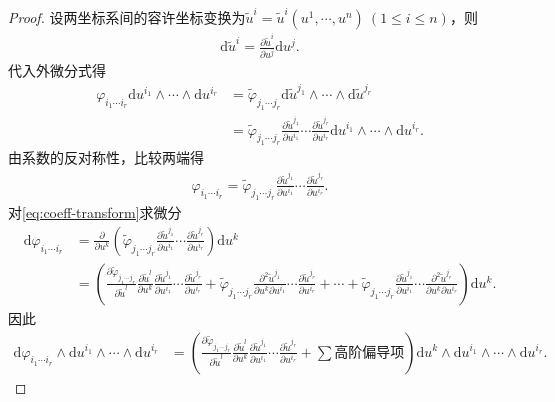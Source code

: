 \documentclass[../../main.tex]{subfiles}%
\begin{document}
\begin{proof}
设两坐标系间的容许坐标变换为$\tilde{u}^i=\tilde{u}^i(u^1,\cdots,u^n)\ (1\leqslant i\leqslant n)$，则
\begin{align}
\mathrm{d}\tilde{u}^i = \frac{\partial\tilde{u}^i}{\partial u^j}\mathrm{d}u^j. \label{eq:coord-diff}
\end{align}
代入外微分式得
\begin{align*}
\varphi_{i_1\cdots i_r}\mathrm{d}u^{i_1}\land\cdots\land\mathrm{d}u^{i_r} &= \tilde{\varphi}_{j_1\cdots j_r}\mathrm{d}\tilde{u}^{j_1}\land\cdots\land\mathrm{d}\tilde{u}^{j_r} \\
&= \tilde{\varphi}_{j_1\cdots j_r}\frac{\partial\tilde{u}^{j_1}}{\partial u^{i_1}}\cdots\frac{\partial\tilde{u}^{j_r}}{\partial u^{i_r}}\mathrm{d}u^{i_1}\land\cdots\land\mathrm{d}u^{i_r}.
\end{align*}
由系数的反对称性，比较两端得
\begin{align}
\varphi_{i_1\cdots i_r} = \tilde{\varphi}_{j_1\cdots j_r}\frac{\partial\tilde{u}^{j_1}}{\partial u^{i_1}}\cdots\frac{\partial\tilde{u}^{j_r}}{\partial u^{i_r}}. \label{eq:coeff-transform}
\end{align}
对\eqref{eq:coeff-transform}求微分
\begin{align*}
\mathrm{d}\varphi_{i_1\cdots i_r} &= \frac{\partial}{\partial u^k}\left(\tilde{\varphi}_{j_1\cdots j_r}\frac{\partial\tilde{u}^{j_1}}{\partial u^{i_1}}\cdots\frac{\partial\tilde{u}^{j_r}}{\partial u^{i_r}}\right)\mathrm{d}u^k \\
&= \left(\frac{\partial\tilde{\varphi}_{j_1\cdots j_r}}{\partial\tilde{u}^l}\frac{\partial\tilde{u}^l}{\partial u^k}\frac{\partial\tilde{u}^{j_1}}{\partial u^{i_1}}\cdots\frac{\partial\tilde{u}^{j_r}}{\partial u^{i_r}}+\tilde{\varphi}_{j_1\cdots j_r}\frac{\partial^2\tilde{u}^{j_1}}{\partial u^k\partial u^{i_1}}\cdots\frac{\partial\tilde{u}^{j_r}}{\partial u^{i_r}}+\cdots+\tilde{\varphi}_{j_1\cdots j_r}\frac{\partial\tilde{u}^{j_1}}{\partial u^{i_1}}\cdots\frac{\partial^2\tilde{u}^{j_r}}{\partial u^k\partial u^{i_r}}\right)\mathrm{d}u^k.
\end{align*}
因此
\begin{align*}
\mathrm{d}\varphi_{i_1\cdots i_r}\land\mathrm{d}u^{i_1}\land\cdots\land\mathrm{d}u^{i_r} &= \left(\frac{\partial\tilde{\varphi}_{j_1\cdots j_r}}{\partial\tilde{u}^l}\frac{\partial\tilde{u}^l}{\partial u^k}\frac{\partial\tilde{u}^{j_1}}{\partial u^{i_1}}\cdots\frac{\partial\tilde{u}^{j_r}}{\partial u^{i_r}}+\sum\text{高阶偏导项}\right)\mathrm{d}u^k\land\mathrm{d}u^{i_1}\land\cdots\land\mathrm{d}u^{i_r}.

\end{align*}
\end{proof}
\end{document}
